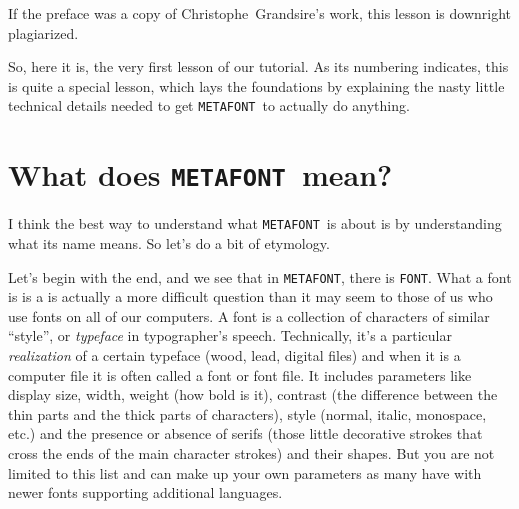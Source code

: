 \documentclass[a4paper,11pt,twoside]{book}
\newcommand{\MF}{{\tt METAFONT}}
\begin{document}
\begin{framed}
If the preface was a copy of Christophe~Grandsire's work, this lesson is downright plagiarized.
\end{framed}

So, here it is, the very first lesson of our tutorial.
As its numbering indicates, this is quite a special lesson, which lays the foundations by
explaining the nasty little technical details needed to get \MF\ to actually do anything.

\section{What does \MF\ mean?}

I think the best way to understand what \MF\ is about is by understanding what its name means.
So let's do a bit of etymology.

Let's begin with the end, and we see that in \MF, there is \texttt{FONT}.
What a font is is a is actually a more difficult question than it may seem to those of us who use
fonts on all of our computers.
A font is a collection of characters of similar ``style'', or \emph{typeface} in typographer's
speech.
Technically, it's a particular \emph{realization} of a certain typeface (wood, lead, digital
files) and when it is a computer file it is often called a font or font file.
It includes parameters like display size, width, weight (how bold is it), contrast (the
difference between the thin parts and the thick parts of characters), style (normal, italic,
monospace, etc.) and the presence or absence of serifs (those little decorative strokes that
cross the ends of the main character strokes) and their shapes.
But you are not limited to this list and can make up your own parameters as many have with newer
fonts supporting additional languages.
\end{document}
